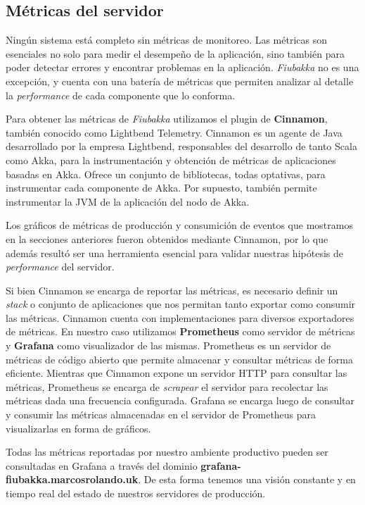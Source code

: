 \subsection{Métricas del servidor}

\noindent Ningún sistema está completo sin métricas de monitoreo. Las métricas son esenciales no solo para medir el desempeño de la aplicación, sino también para poder detectar errores y encontrar problemas en la aplicación.
\textit{Fiubakka} no es una excepción, y cuenta con una batería de métricas que permiten analizar al detalle la \textit{performance} de cada componente que lo conforma.

Para obtener las métricas de \textit{Fiubakka} utilizamos el plugin de \textbf{Cinnamon}, también conocido como Lightbend Telemetry. Cinnamon es un agente de Java desarrollado por la empresa Lightbend, responsables del desarrollo de tanto Scala
como Akka, para la instrumentación y obtención de métricas de aplicaciones basadas en Akka. Ofrece un conjunto de bibliotecas, todas optativas, para instrumentar cada componente de Akka. Por supuesto, también permite instrumentar la JVM de la aplicación
del nodo de Akka.

Los gráficos de métricas de producción y consumición de eventos que mostramos en la secciones anteriores fueron obtenidos mediante Cinnamon, por lo que además resultó ser una herramienta esencial para validar nuestras hipótesis de \textit{performance}
del servidor.

Si bien Cinnamon se encarga de reportar las métricas, es necesario definir un \textit{stack} o conjunto de aplicaciones que nos permitan tanto exportar como consumir las métricas. Cinnamon cuenta con implementaciones para diversos exportadores de métricas.
En nuestro caso utilizamos \textbf{Prometheus} como servidor de métricas y \textbf{Grafana} como visualizador de las mismas. Prometheus es un servidor de métricas de código abierto que permite almacenar y consultar métricas de forma eficiente.
Mientras que Cinnamon expone un servidor HTTP para consultar las métricas, Prometheus se encarga de \textit{scrapear} el servidor para recolectar las métricas dada una frecuencia configurada. Grafana se encarga luego de consultar y consumir las métricas almacenadas
en el servidor de Prometheus para visualizarlas en forma de gráficos.

Todas las métricas reportadas por nuestro ambiente productivo pueden ser consultadas en Grafana a través del dominio \textbf{grafana-fiubakka.marcosrolando.uk}. De esta forma tenemos una visión constante y en tiempo real del estado de nuestros servidores de producción.

